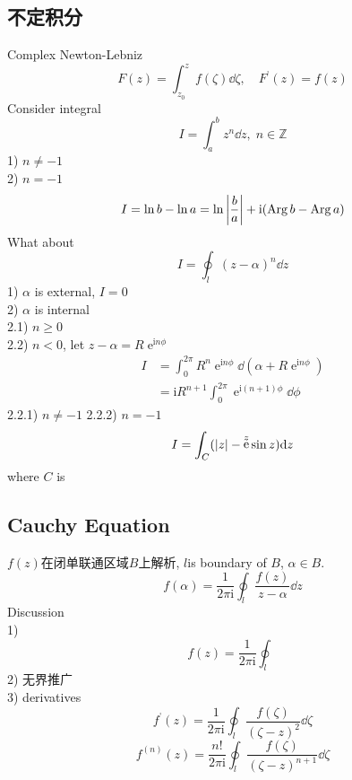 \documentclass[UTF8]{ctexart} %
\DeclareMathOperator{\p}{\prime}
\DeclareMathOperator{\e}{\mathrm{e}}
\renewcommand{\I}{\mathrm{i}}
\DeclareMathOperator{\Arg}{\mathrm{Arg}}
\numberwithin{equation}{section}
\begin{document}
\subsection{不定积分}
Complex Newton-Lebniz
\begin{equation}\label{key}
F(z)=\int_{z_0}^z f(\zeta)\dd\zeta,\quad F^{\p}(z)=f(z)
\end{equation}
Consider integral
\begin{equation}\label{key}
I=\int_a^b z^n\dd z,\;n\in\mathbb{Z}
\end{equation}
1) $n\neq -1$\\
2) $n=-1$
\begin{equation}\label{key}
I=\ln b-\ln a=\ln\abs{\dfrac{b}{a}}+\I(\Arg b-\Arg a)
\end{equation}
What about
\begin{equation}\label{key}
I=\oint_l (z-\alpha)^n\dd z
\end{equation}
1) $\alpha$ is external, $I=0$\\
2) $\alpha$ is internal\\
2.1) $n\geqslant 0$\\
2.2) $n<0$, let $z-\alpha=R\e^{\I n\phi}$
\begin{equation}\label{key}
\begin{aligned}
I&=\int_0^{2\pi}R^n\e^{\I n\phi}\dd(\alpha+R\e^{\I n\phi})\\
&=\I R^{n+1}\int_0^{2\pi}\e^{\I(n+1)\phi}\dd\phi
\end{aligned}
\end{equation}
2.2.1) $n\neq -1$
2.2.2) $n=-1$
~\\
\begin{equation}\label{key}
I=\int_C (\abs{z}-\e^z\sin z)\dd z
\end{equation}
where $C$ is 

\subsection{Cauchy Equation}
$f(z)$在闭单联通区域$B$上解析, $l$is boundary of $B$, $\alpha\in B$.
\begin{equation}\label{key}
f(\alpha)=\dfrac{1}{2\pi\I}\oint_l \dfrac{f(z)}{z-\alpha}\dd z
\end{equation}
Discussion\\
1)
\begin{equation}\label{key}
f(z)=\dfrac{1}{2\pi\I}\oint_l\dfrac{}{}
\end{equation}
2) 无界推广\\
3) derivatives
\begin{equation}\label{key}
f^{\p}(z)=\dfrac{1}{2\pi\I}\oint_l\dfrac{f(\zeta)}{(\zeta-z)^2}\dd\zeta
\end{equation}
\begin{equation}\label{key}
f^{(n)}(z)=\dfrac{n!}{2\pi\I}\oint_l\dfrac{f(\zeta)}{(\zeta-z)^{n+1}}\dd\zeta
\end{equation}
\end{document}

